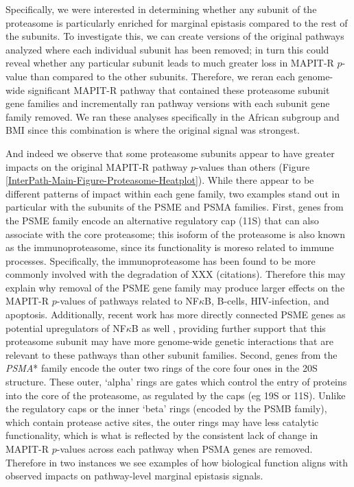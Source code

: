 \documentclass[12pt,a4paper]{article}
\begin{document}
Specifically, we were interested in determining whether any subunit of the proteasome is particularly enriched for marginal epistasis compared to the rest of the subunits. To investigate this, we can create versions of the original pathways analyzed where each individual subunit has been removed; in turn this could reveal whether any particular subunit leads to much greater loss in MAPIT-R $p$-value than compared to the other subunits. Therefore, we reran each genome-wide significant MAPIT-R pathway that contained these proteasome subunit gene families and incrementally ran pathway versions with each subunit gene family removed. We ran these analyses specifically in the African subgroup and BMI since this combination is where the original signal was strongest. 

And indeed we observe that some proteasome subunits appear to have greater impacts on the original MAPIT-R pathway $p$-values than others (Figure \ref{InterPath-Main-Figure-Proteasome-Heatplot}).
While there appear to be different patterns of impact within each gene family, two examples stand out in particular with the subunits of the PSME and PSMA families. First, genes from the PSME family encode an alternative regulatory cap (11S) that can also associate with the core proteasome; this isoform of the proteasome is also known as the immunoproteasome, since its functionality is moreso related to immune processes. Specifically, the immunoproteasome has been found to be more commonly involved with the degradation of XXX (citations). Therefore this may explain why removal of the PSME gene family may produce larger effects on the MAPIT-R $p$-values of pathways related to NF$\kappa$B, B-cells, HIV-infection, and apoptosis. Additionally, recent work has more directly connected PSME genes as potential upregulators of NF$\kappa$B as well \citep{Sun2016,Mitchell2019}, providing further support that this proteasome subunit may have more genome-wide genetic interactions that are relevant to these pathways than other subunit families. Second, genes from the \textit{PSMA}* family encode the outer two rings of the core four ones in the 20S structure. These outer, `alpha' rings are gates which control the entry of proteins into the core of the proteasome, as regulated by the caps (eg 19S or 11S). Unlike the regulatory caps or the inner `beta' rings (encoded by the PSMB family), which contain protease active sites, the outer rings may have less catalytic functionality, which is what is reflected by the consistent lack of change in MAPIT-R $p$-values across each pathway when PSMA genes are removed. Therefore in two instances we see examples of how biological function aligns with observed impacts on pathway-level marginal epistasis signals.
\end{document}
